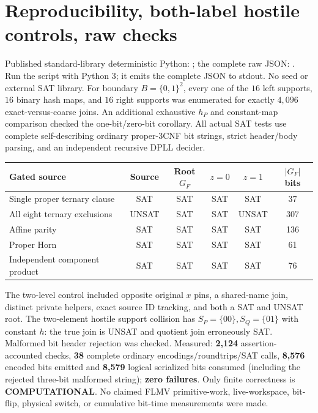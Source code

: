 \documentclass[11pt]{article}
\begin{document}
\section{Reproducibility, both-label hostile controls, raw checks}
Published standard-library deterministic Python:
;
the complete raw JSON:
.
Run the script with Python 3; it emits the complete JSON
to stdout. No seed or external SAT library.
For boundary $B=\{0,1\}^2$, every one of the $16$ left supports,
$16$ binary hash maps, and $16$ right supports was enumerated
for exactly $4,096$ exact-versus-coarse joins.
An additional exhaustive $h_P$ and constant-map comparison
checked the one-bit/zero-bit corollary.
All actual SAT tests use complete self-describing
ordinary proper-3CNF bit strings, strict header/body parsing,
and an independent recursive DPLL decider.

\begin{center}
\begin{tabular}{lccccc}
\toprule
Gated source & Source & Root $G_F$ & $z=0$ & $z=1$ & $|G_F|$ bits\\
\midrule
Single proper ternary clause& SAT & SAT& SAT& SAT&37\\
All eight ternary exclusions& UNSAT&SAT&SAT&UNSAT&307\\
Affine parity& SAT&SAT&SAT&SAT&136\\
Proper Horn&SAT&SAT&SAT&SAT&61\\
Independent component product&SAT&SAT&SAT&SAT&76\\
\bottomrule
\end{tabular}
\end{center}
The two-level control included opposite original $x$ pins,
a shared-name join, distinct private helpers, exact source ID
tracking, and both a SAT and UNSAT root.
The two-element hostile support collision has
$S_P=\{00\},S_Q=\{01\}$ with constant $h$:
the true join is UNSAT and quotient join erroneously SAT.
Malformed bit header rejection was checked.
Measured: \textbf{2,124} assertion-accounted checks,
\textbf{38} complete ordinary encodings/roundtrips/SAT calls,
\textbf{8,576} encoded bits emitted and \textbf{8,579}
logical serialized bits consumed (including the rejected
three-bit malformed string); \textbf{zero failures}.
Only finite correctness is \textbf{COMPUTATIONAL}.
No claimed FLMV primitive-work, live-workspace, bit-flip,
physical switch, or cumulative bit-time measurements were made.
\end{document}
